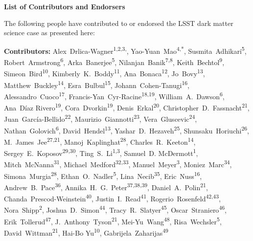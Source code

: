 
\begin{center}
  {\Large \bf List of Contributors and Endorsers}
\end{center}
\bigskip

The following people have contributed to or endorsed the LSST dark matter science case as presented here:

\def\altaffilmark#1{\textsuperscript{#1}}
\def\affil#1{\noindent #1 \\}

\normalsize
\begin{raggedright}
\textbf{Contributors:}
Alex~Drlica-Wagner\altaffilmark{1,2,3,\textdagger},
Yao-Yuan~Mao\altaffilmark{4,*},
Susmita~Adhikari\altaffilmark{5},
Robert~Armstrong\altaffilmark{6},
Arka~Banerjee\altaffilmark{5},
Nilanjan~Banik\altaffilmark{7,8},
Keith~Bechtol\altaffilmark{9},
Simeon~Bird\altaffilmark{10},
Kimberly~K.~Boddy\altaffilmark{11},
Ana~Bonaca\altaffilmark{12},
Jo~Bovy\altaffilmark{13},
Matthew~Buckley\altaffilmark{14},
Esra~Bulbul\altaffilmark{15},
Johann~Cohen-Tanugi\altaffilmark{16},
Alessandro~Cuoco\altaffilmark{17},
Francis-Yan~Cyr-Racine\altaffilmark{18,19},
William~A.~Dawson\altaffilmark{6},
Ana~D\'{i}az Rivero\altaffilmark{19},
Cora~Dvorkin\altaffilmark{19},
Denis~Erkal\altaffilmark{20},
Christopher~D.~Fassnacht\altaffilmark{21},
Juan~Garc\'ia-Bellido\altaffilmark{22},
Maurizio~Giannotti\altaffilmark{23},
Vera~Gluscevic\altaffilmark{24},
Nathan~Golovich\altaffilmark{6},
David~Hendel\altaffilmark{13},
Yashar~D.~Hezaveh\altaffilmark{25},
Shunsaku~Horiuchi\altaffilmark{26},
M.~James~Jee\altaffilmark{27,21},
Manoj~Kaplinghat\altaffilmark{28},
Charles~R.~Keeton\altaffilmark{14},
Sergey~E.~Koposov\altaffilmark{29,30},
Ting~S.~Li\altaffilmark{1,3},
Samuel~D. McDermott\altaffilmark{1},
Mitch~McNanna\altaffilmark{31},
Michael~Medford\altaffilmark{32,33},
Manuel~Meyer\altaffilmark{3},
Moniez~Marc\altaffilmark{34},
Simona~Murgia\altaffilmark{28},
Ethan~O.~Nadler\altaffilmark{5},
Lina~Necib\altaffilmark{35},
Eric~Nuss\altaffilmark{16},
Andrew~B.~Pace\altaffilmark{36},
Annika~H.~G.~Peter\altaffilmark{37,38,39},
Daniel~A.~Polin\altaffilmark{21},
Chanda~Prescod-Weinstein\altaffilmark{40},
Justin~I.~Read\altaffilmark{41},
Rogerio~Rosenfeld\altaffilmark{42,43},
Nora~Shipp\altaffilmark{2},
Joshua~D.~Simon\altaffilmark{44},
Tracy~R.~Slatyer\altaffilmark{45},
Oscar~Straniero\altaffilmark{46},
Erik~Tollerud\altaffilmark{47},
J.~Anthony~Tyson\altaffilmark{21},
Mei-Yu~Wang\altaffilmark{48},
Risa~Wechsler\altaffilmark{5},
David~Wittman\altaffilmark{21},
Hai-Bo Yu\altaffilmark{10},
Gabrijela~Zaharijas\altaffilmark{49}


\end{raggedright}
